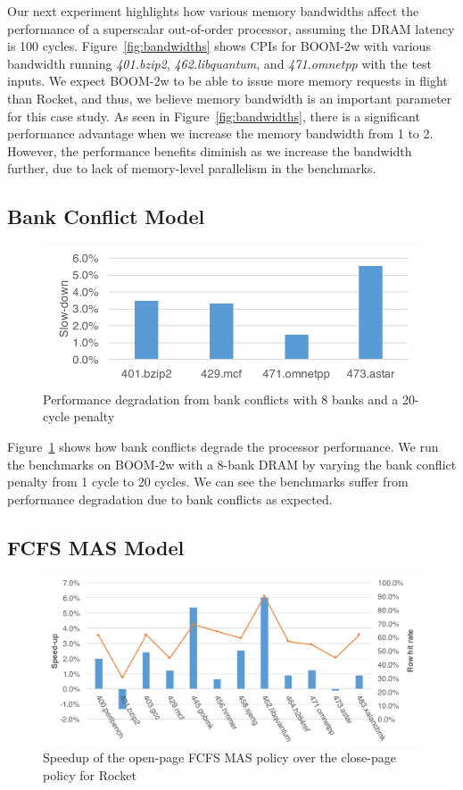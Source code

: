 Our next experiment highlights how various memory bandwidths affect the performance of
a superscalar out-of-order processor, assuming the DRAM latency is 100 cycles.
Figure~\ref{fig:bandwidths} shows CPIs for BOOM-2w with various bandwidth 
running \textit{401.bzip2}, \textit{462.libquantum}, and \textit{471.omnetpp}
with the test inputs.
We expect BOOM-2w to be able to issue more memory requests in flight than Rocket,
and thus, we believe memory bandwidth is an important parameter for this case study.
As seen in Figure~\ref{fig:bandwidths}, there is a significant performance
advantage when we increase the memory bandwidth from 1 to 2. However,
the performance benefits diminish as we increase the bandwidth further,
due to lack of memory-level parallelism in the benchmarks.

\subsection{Bank Conflict Model}

\begin{figure}[t]
	\centering
	\includegraphics[width=0.8\columnwidth]{figures/boom-bc.pdf}
	\caption{Performance degradation from bank conflicts with 8 banks and a 20-cycle penalty}
	\label{fig:bank_conflict}
\end{figure}

Figure~\ref{fig:bank_conflict} shows how bank conflicts degrade the processor performance.
We run the benchmarks on BOOM-2w with a 8-bank DRAM by varying the bank conflict penalty 
from 1 cycle to 20 cycles. We can see the benchmarks suffer from performance degradation
due to bank conflicts as expected.

\subsection{FCFS MAS Model}

\begin{figure}[t]
		\centering
		\includegraphics[width=\columnwidth]{figures/rocket-fifomas.pdf}
		\caption{Speedup of the open-page FCFS MAS policy over the close-page policy for Rocket}
		\label{fig:rocket_fifo_mas}
\end{figure}

